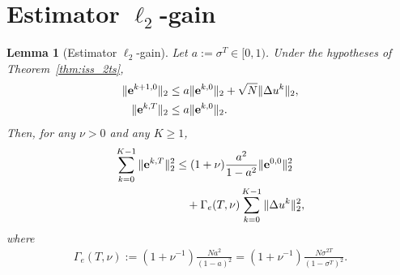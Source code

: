 \documentclass[letterpaper, 10 pt, conference]{ieeeconf} %
\newtheorem{lemma}{Lemma}
\begin{document}
\section{Estimator $\ell_2$-gain}
\begin{lemma}[Estimator $\ell_2$-gain]\label{lem:l2_gain}
Let \(a:=\sigma^T\in[0,1)\). Under the hypotheses of Theorem~\ref{thm:iss_2ts},
\begin{align}
\|\mathbf e^{k+1,0}\|_2
&\le
a\|\mathbf e^{k,0}\|_2+\sqrt N\|\Delta u^k\|_2, \notag\\
\|\mathbf e^{k,T}\|_2
&\le
a\|\mathbf e^{k,0}\|_2 .
\end{align}
Then, for any \(\nu>0\) and any \(K\ge 1\),
\begin{align}
\sum_{k=0}^{K-1}\|\mathbf e^{k,T}\|_2^2
&\le
(1+\nu)\frac{a^2}{1-a^2}\|\mathbf e^{0,0}\|_2^2 \notag\\
&\quad +
\Gamma_e(T,\nu)
\sum_{k=0}^{K-1}\|\Delta u^k\|_2^2,
\end{align}
where
\begin{align}
\Gamma_e(T,\nu)
:=
(1+\nu^{-1})
\frac{N a^2}{(1-a)^2}
=
(1+\nu^{-1})
\frac{N\sigma^{2T}}{(1-\sigma^T)^2}.
\end{align}
\end{lemma}
\end{document}
